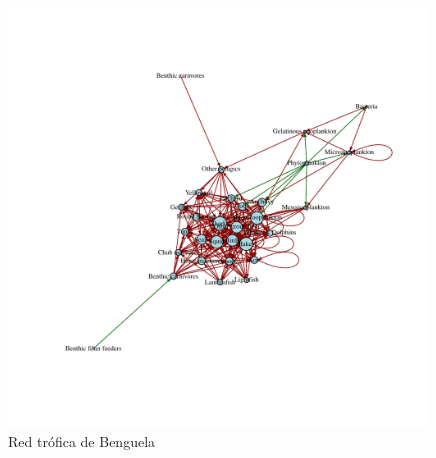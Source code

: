 \begin{figure}
  \centering
  \includegraphics[width = 0.99\textwidth]{./Plots/Benguela.pdf}
  \caption[Benguela]{Red tr\'ofica de Benguela \citep{yodzis1998:localTD}}
  \label{fig:Benguela}
\end{figure}



